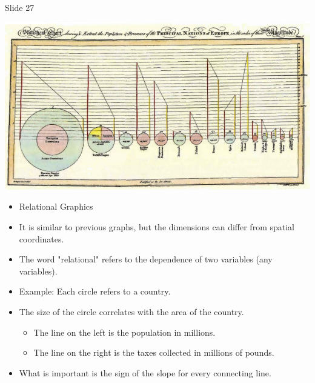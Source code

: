 \documentclass[
  ignorenonframetext,
]{beamer}
\begin{document}
\begin{frame}{Slide 27}
\protect\hypertarget{slide-27}{}
\begin{minipage}{0.45\textwidth}
\centering
\includegraphics[width=\textwidth]{excellence_figs/fig_24.png}
\end{minipage}
\hfill
\begin{minipage}{0.5\textwidth}
\footnotesize
\begin{itemize}
  \item Relational Graphics
  \item It is similar to previous graphs, but the dimensions can differ from spatial coordinates.
  \item The word "relational" refers to the dependence of two variables (any variables).
  \item Example: Each circle refers to a country.
  \item The size of the circle correlates with the area of the country.
  \begin{itemize}
    \item The line on the left is the population in millions.
    \item The line on the right is the taxes collected in millions of pounds.
  \end{itemize}
  \item What is important is the sign of the slope for every connecting line.
\end{itemize}
\end{minipage}
\end{frame}
\end{document}
